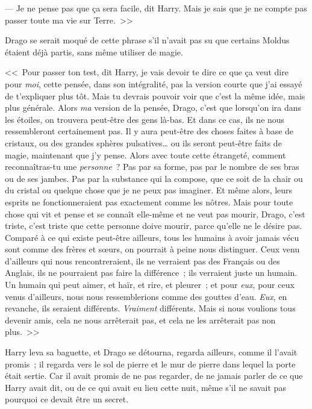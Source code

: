 --- Je ne pense pas que ça sera facile, dit Harry. Mais je sais que je ne compte pas passer toute ma vie sur Terre.~>>

Drago se serait moqué de cette phrase s'il n'avait pas su que certains Moldus étaient déjà partis, sans même utiliser de magie.

<<~Pour passer ton test, dit Harry, je vais devoir te dire ce que ça veut dire pour \emph{moi}, cette pensée, dans son intégralité, pas la version courte que j'ai essayé de t'expliquer plus tôt. Mais tu devrais pouvoir voir que c'est la même idée, mais plus générale. Alors \emph{ma} version de la pensée, Drago, c'est que lorsqu'on ira dans les étoiles, on trouvera peut-être des gens là-bas. Et dans ce cas, ils ne nous ressembleront certainement pas. Il y aura peut-être des choses faites à base de cristaux, ou des grandes sphères pulsatives… ou ils seront peut-être faits de magie, maintenant que j'y pense. Alors avec toute cette étrangeté, comment reconnaîtras-tu une \emph{personne}~? Pas par sa forme, pas par le nombre de ses bras ou de ses jambes. Pas par la substance qui la compose, que ce soit de la chair ou du cristal ou quelque chose que je ne peux pas imaginer. Et même alors, leurs esprits ne fonctionneraient pas exactement comme les nôtres. Mais pour toute chose qui vit et pense et se connaît elle-même et ne veut pas mourir, Drago, c'est triste, c'est triste que cette personne doive mourir, parce qu'elle ne le désire pas. Comparé à ce qui existe peut-être ailleurs, tous les humains à avoir jamais vécu sont comme des frères et sœurs, on pourrait à peine nous distinguer. Ceux venu d'ailleurs qui nous rencontreraient, ils ne verraient pas des Français ou des Anglais, ils ne pourraient pas faire la différence~; ils verraient juste un humain. Un humain qui peut aimer, et haïr, et rire, et pleurer~; et pour \emph{eux}, pour ceux venus d'ailleurs, nous nous ressemblerions comme des gouttes d'eau. \emph{Eux}, en revanche, ils seraient différents. \emph{Vraiment} différents. Mais si nous voulions tous devenir amis, cela ne nous arrêterait pas, et cela ne les arrêterait pas non plus.~>>

Harry leva sa baguette, et Drago se détourna, regarda ailleurs, comme il l'avait promis~; il regarda vers le sol de pierre et le mur de pierre dans lequel la porte était sertie. Car il avait promis de ne pas regarder, de ne jamais parler de ce que Harry avait dit, ou de ce qui avait eu lieu cette nuit, même s'il ne savait pas pourquoi ce devait être un secret.

